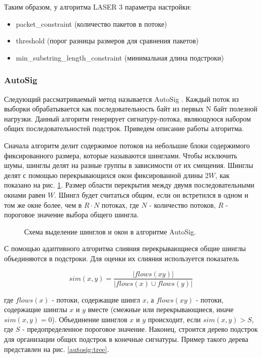 Таким образом, у алгоритма LASER 3 параметра настройки:
\begin{itemize}
    \item packet\_constraint (количество пакетов в потоке)
    \item threshold (порог разницы размеров для сравнения пакетов)
    \item min\_substring\_length\_constraint (минимальная длина подстроки)
\end{itemize}

\subsubsection{AutoSig}

Следующий рассматриваемый метод называется AutoSig \cite{ye2009autosig, santosautomatic}.
Каждый поток из выборки обрабатывается как последовательность байт из первых N байт полезной нагрузки.
Данный алгоритм генерирует сигнатуру-потока, являющуюся набором общих последовательностей подстрок.
Приведем описание работы алгоритма.

Сначала алгоритм делит содержимое потоков на небольшие блоки содержимого фиксированного размера, которые называются шинглами.
Чтобы исключить шумы, шинглы делят на разные группы в зависимости от их смещения. Шинглы делят с помощью перекрывающихся окон фиксированной длины $2W$,
как показано на рис. \ref{autosig:shingles}. Размер области перекрытия между двумя последовательными окнами равен $W$.
Шингл будет считаться общим, если он встретился в одном и том же окне более, чем в $R \cdot N$ потоках,
где $N$ - количество потоков, $R$ - пороговое значение выбора общего шингла.

\begin{figure}[H]
    \begin{center}
        
        \caption{Схема выделение шинглов и окон в алгоритме AutoSig.}\label{autosig:shingles}
    \end{center}
\end{figure}

С помощью адаптивного алгоритма слияния перекрывающиеся общие шинглы объединяются в подстроки.
Для оценки их слияния используется показатель

$$ sim(x, y) = \frac{|flows(xy)|}{|flows(x) \cup flows(y)|} $$

где $flows(x)$ - потоки, содержащие шингл $x$, а $flows(xy)$ - потоки, содержащие шинглы $x$ и $y$ вместе (смежные или перекрывающиеся, иначе $sim(x, y) = 0$).
Объединение шинглов $x$ и $y$ происходит, если $sim(x, y)>S$, где $S$ - предопределенное пороговое значение.
Наконец, строится дерево подстрок для организации общих подстрок в конечные сигнатуры. Пример такого дерева представлен на рис. \ref{autosig:tree}.

